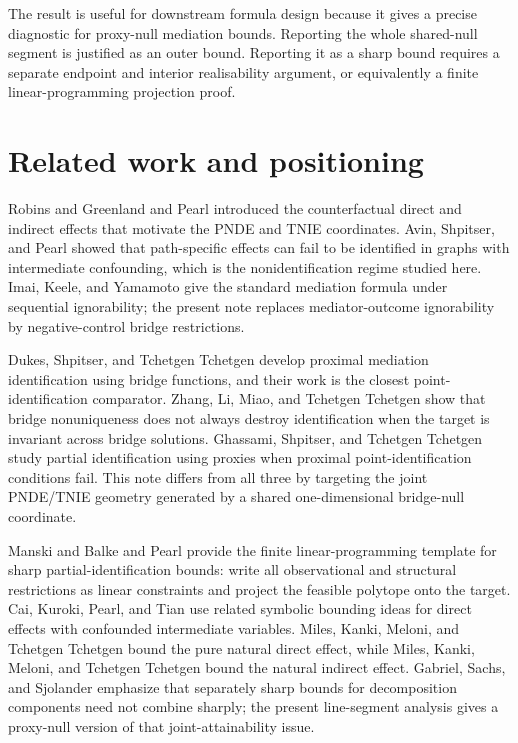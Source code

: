 \documentclass[11pt]{article}
\theoremstyle{definition}
\theoremstyle{plain}
\theoremstyle{remark}
\begin{document}
The result is useful for downstream formula design because it gives a precise
diagnostic for proxy-null mediation bounds.  Reporting the whole shared-null
segment is justified as an outer bound.  Reporting it as a sharp bound requires
a separate endpoint and interior realisability argument, or equivalently a
finite linear-programming projection proof.

\section{Related work and positioning}
Robins and Greenland \cite{RobinsGreenland1992} and Pearl \cite{Pearl2001}
introduced the counterfactual direct and indirect effects that motivate the
PNDE and TNIE coordinates.  Avin, Shpitser, and Pearl
\cite{AvinShpitserPearl2005} showed that path-specific effects can fail to be
identified in graphs with intermediate confounding, which is the
nonidentification regime studied here.  Imai, Keele, and Yamamoto
\cite{ImaiKeeleYamamoto2010} give the standard mediation formula under
sequential ignorability; the present note replaces mediator-outcome
ignorability by negative-control bridge restrictions.

Dukes, Shpitser, and Tchetgen Tchetgen \cite{DukesShpitserTchetgen2023} develop
proximal mediation identification using bridge functions, and their work is the
closest point-identification comparator.  Zhang, Li, Miao, and Tchetgen
Tchetgen \cite{ZhangLiMiaoTchetgen2023} show that bridge nonuniqueness does not
always destroy identification when the target is invariant across bridge
solutions.  Ghassami, Shpitser, and Tchetgen Tchetgen
\cite{GhassamiShpitserTchetgen2023} study partial identification using proxies
when proximal point-identification conditions fail.  This note differs from all
three by targeting the joint PNDE/TNIE geometry generated by a shared
one-dimensional bridge-null coordinate.

Manski \cite{Manski1990} and Balke and Pearl \cite{BalkePearl1997} provide the
finite linear-programming template for sharp partial-identification bounds:
write all observational and structural restrictions as linear constraints and
project the feasible polytope onto the target.  Cai, Kuroki, Pearl, and Tian
\cite{CaiKurokiPearlTian2008} use related symbolic bounding ideas for direct
effects with confounded intermediate variables.  Miles, Kanki, Meloni, and
Tchetgen Tchetgen \cite{MilesKankiMeloniTchetgen2015} bound the pure natural
direct effect, while Miles, Kanki, Meloni, and Tchetgen Tchetgen
\cite{MilesKankiMeloniTchetgen2017} bound the natural indirect effect.  Gabriel,
Sachs, and Sjolander \cite{GabrielSachsSjolander2023} emphasize that separately
sharp bounds for decomposition components need not combine sharply; the present
line-segment analysis gives a proxy-null version of that joint-attainability
issue.
\end{document}
